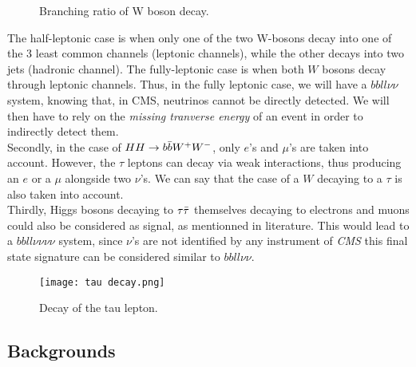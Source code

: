 \begin{figure}[H]
    \centering
    \caption{Branching ratio of W boson decay.}
\end{figure}

The half-leptonic case is when only one of the two W-bosons decay into one of the 3 least common channels (leptonic channels), while the other decays into two jets (hadronic channel). The fully-leptonic case is when both $W$ bosons decay through leptonic channels. Thus, in the fully leptonic case, we will have a $bbll\nu \nu$ system, knowing that, in CMS, neutrinos cannot be directly detected. We will then have to rely on the \textit{missing tranverse energy} of an event in order to indirectly detect them.\\
Secondly, in the case of $HH \rightarrow b \Bar{b} W^+ W^-$, only $e$'s and $\mu$'s are taken into account. However, the $\tau$ leptons can decay via weak interactions, thus producing an $e$ or a $\mu$ alongside two $\nu$'s. We can say that the case of a $W$ decaying to a $\tau$ is also taken into account.\\
Thirdly, Higgs bosons decaying to $\tau \Bar{\tau}$ themselves decaying to electrons and muons could also be considered as signal, as mentionned in literature. This would lead to a $bbll \nu \nu \nu \nu$ system, since $\nu$'s are not identified by any instrument of \textit{CMS} this final state signature can be considered similar to $bbll \nu \nu$.\\

\begin{figure}[H]
    \centering
    \texttt{[image: tau decay.png]}
    \caption{Decay of the tau lepton.}
    \label{fig:enter-label}
\end{figure}

\subsection{Backgrounds}


